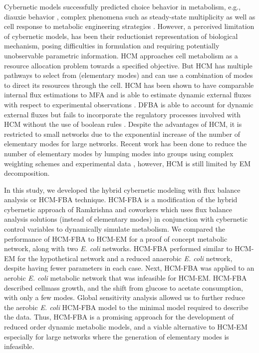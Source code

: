\documentclass[10pt,twocolumn,twoside,final]{IEEEtran}
\begin{document}
Cybernetic models successfully predicted choice behavior in metabolism, e.g., diauxie behavior \cite{1986_kompala_ramkrishna_tsao_BiotechBioeng}, complex phenomena such as steady-state multiplicity \cite{2012_kim_ramkrishna_BiotechProg} as well as cell response to metabolic engineering strategies \cite{1999_varner_ramkrishna_MetaEng}.
However, a perceived limitation of cybernetic models, has been their reductionist representation
of biological mechanism, posing difficulties in formulation and requiring potentially unobservable parametric information.
HCM approaches cell metabolism as a resource allocation problem towards a specified objective.
But HCM has multiple pathways to select from (elementary modes) and can use a combination of modes to direct its resources through the cell.
HCM has been shown to have comparable internal flux estimations to MFA and is able to estimate dynamic external fluxes with respect to experimental observations \cite{2008_kim_varner_ramkrishna_BiotechProg}.
DFBA is able to account for dynamic external fluxes but fails to incorporate the regulatory processes involved with HCM without the use of boolean rules \cite{2001_covert_schilling_palsson}.
Despite the advantages of HCM, it is restricted to small networks due to the exponential increase of the number of elementary modes for large networks.
Recent work has been done to reduce the number of elementary modes by lumping modes into groups using complex weighting schemes and experimental data \cite{2010_song_ramkrishna}, however, HCM is still limited by EM decomposition.

In this study, we developed the hybrid cybernetic modeling with flux balance analysis or HCM-FBA technique.
HCM-FBA is a modification of the hybrid cybernetic approach of Ramkrishna and coworkers which uses flux balance analysis solutions
(instead of elementary modes) in conjunction with cybernetic control variables to dynamically simulate metabolism.
We compared the performance of HCM-FBA to HCM-EM for a proof of concept metabolic network, along with two \emph{E. coli} networks.
HCM-FBA performed similar to HCM-EM for the hypothetical network and a reduced anaerobic \textit{E. coli} network, despite having fewer parameters in each case.
Next, HCM-FBA was applied to an aerobic \textit{E. coli} metabolic network that was infeasible for HCM-EM.
HCM-FBA described cellmass growth, and the shift from glucose to acetate consumption, with only a few modes.
Global sensitivity analysis allowed us to further reduce the aerobic \textit{E. coli} HCM-FBA model to the minimal model required to describe the data.
Thus, HCM-FBA is a promising approach for the development of reduced order dynamic metabolic models,
and a viable alternative to HCM-EM especially for large networks where the generation of elementary modes is infeasible.
\end{document}
